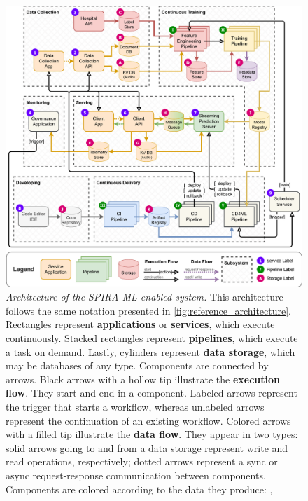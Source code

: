 \begin{figure}[p]
  \centering
  \includegraphics[width=\linewidth]{figures/SPIRA.pdf}
  \caption[%
    Architecture of the SPIRA ML-enabled system%
  ]{%
    \emph{Architecture of the SPIRA ML-enabled system.}
    This architecture follows the same notation presented in
    \cref{fig:reference_architecture}.
    Rectangles represent \textbf{applications} or \textbf{services},
      which execute continuously.
    Stacked rectangles represent \textbf{pipelines},
      which execute a task on demand.
    Lastly, cylinders represent \textbf{data storage},
      which may be databases of any type.
    Components are connected by arrows.
    Black arrows with a hollow tip illustrate the \textbf{execution flow}.
      They start and end in a component.
      Labeled arrows represent the trigger that starts a workflow,
      whereas unlabeled arrows represent the continuation of an
      existing workflow.
    Colored arrows with a filled tip illustrate the \textbf{data flow}.
    They appear in two types:
      solid arrows going to and from a data storage represent
      write and read operations, respectively;
      dotted arrows represent a sync or async request-response
      communication between components.
    Components are colored according to the data they produce:
      \mbox{},
}
\end{figure}
